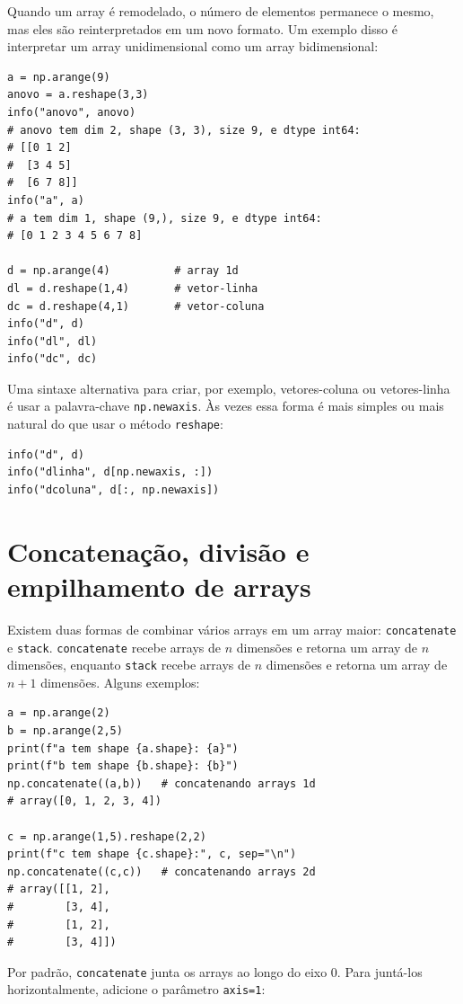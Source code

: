 \documentclass[11pt,a4paper]{article}
\begin{document}
Quando um array é remodelado, o número de elementos permanece o mesmo,
mas eles são reinterpretados em um novo formato. Um exemplo disso é
interpretar um array unidimensional como um array bidimensional:

\begin{lstlisting}
a = np.arange(9)
anovo = a.reshape(3,3)
info("anovo", anovo)
# anovo tem dim 2, shape (3, 3), size 9, e dtype int64:
# [[0 1 2]
#  [3 4 5]
#  [6 7 8]]
info("a", a)
# a tem dim 1, shape (9,), size 9, e dtype int64:
# [0 1 2 3 4 5 6 7 8]

d = np.arange(4)          # array 1d
dl = d.reshape(1,4)       # vetor-linha
dc = d.reshape(4,1)       # vetor-coluna
info("d", d)
info("dl", dl)
info("dc", dc)
\end{lstlisting}

Uma sintaxe alternativa para criar, por exemplo, vetores-coluna ou
vetores-linha é usar a palavra-chave \texttt{np.newaxis}. Às vezes essa
forma é mais simples ou mais natural do que usar o método
\texttt{reshape}:

\begin{lstlisting}
info("d", d)
info("dlinha", d[np.newaxis, :])
info("dcoluna", d[:, np.newaxis])
\end{lstlisting}

\section{Concatenação, divisão e empilhamento de arrays}

Existem duas formas de combinar vários arrays em um array maior:
\texttt{concatenate} e \texttt{stack}. \texttt{concatenate} recebe
arrays de $n$ dimensões e retorna um array de $n$ dimensões, enquanto
\texttt{stack} recebe arrays de $n$ dimensões e retorna um array de
$n+1$ dimensões. Alguns exemplos:

\begin{lstlisting}
a = np.arange(2)
b = np.arange(2,5)
print(f"a tem shape {a.shape}: {a}")
print(f"b tem shape {b.shape}: {b}")
np.concatenate((a,b))   # concatenando arrays 1d
# array([0, 1, 2, 3, 4])

c = np.arange(1,5).reshape(2,2)
print(f"c tem shape {c.shape}:", c, sep="\n")
np.concatenate((c,c))   # concatenando arrays 2d
# array([[1, 2],
#        [3, 4],
#        [1, 2],
#        [3, 4]])
\end{lstlisting}

Por padrão, \texttt{concatenate} junta os arrays ao longo do eixo 0.
Para juntá-los horizontalmente, adicione o parâmetro \texttt{axis=1}:
\end{document}
